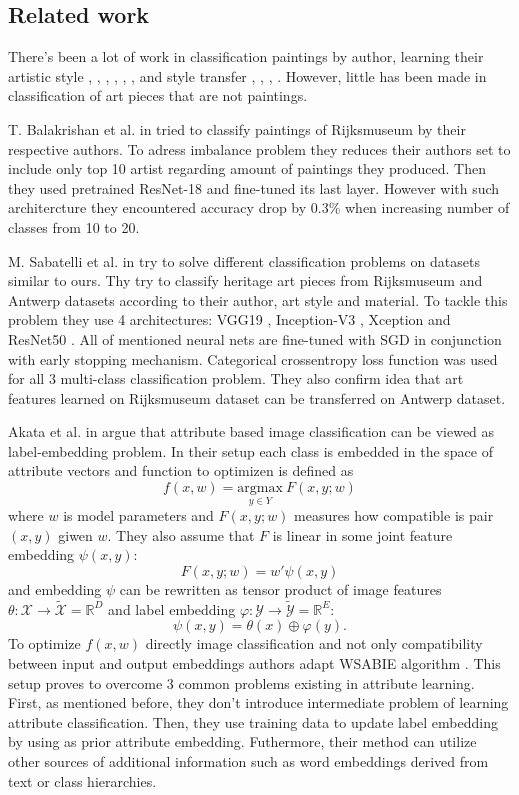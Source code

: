 \documentclass[10pt,twocolumn,letterpaper]{article}
\begin{document}
\subsection{Related work}

There's been a lot of work in classification paintings by author, learning their artistic style  \cite{paint_class}, \cite{rec_style}, \cite{learned_style}, \cite{draw_style}, \cite{la_style}, \cite{la_style_2}, and style transfer \cite{johnson_style_transf}, \cite{huang_style_transf}, \cite{ulyaniv_stylized_img}, \cite{jie_style_transf}. However, little has been made in classification of art pieces that are not paintings. 

T. Balakrishan et al. in \cite{Rijks} tried to classify paintings of Rijksmuseum by their respective authors. To adress imbalance problem they reduces their authors set to include only top 10 artist regarding amount of paintings they produced. Then they used pretrained ResNet-18 and fine-tuned its last layer. However with such architercture they encountered accuracy drop by 0.3\% when increasing number of classes from 10 to 20.

M. Sabatelli et al. in \cite{deep_cnn_class} try to solve different classification problems on datasets similar to ours. Thy try to classify heritage art pieces from Rijksmuseum and Antwerp datasets according to their author, art style and material. To tackle this problem they use 4 architectures: VGG19 \cite{vgg}, Inception-V3 \cite{inc-v3}, Xception \cite{xception} and ResNet50 \cite{resnet50}. All of mentioned neural nets are fine-tuned with SGD in conjunction with early stopping mechanism. Categorical crossentropy loss function was used for all 3 multi-class classification problem. They also confirm idea that art features learned on Rijksmuseum dataset can be transferred on Antwerp dataset. 

Akata et al. in \cite{akata_emb} argue that attribute based image classification can be viewed as label-embedding problem. In their setup each class is embedded in the space of attribute vectors and function to optimizen is defined as 
$$f(x,w)=\underset{y \in Y}{\mathrm{argmax }}\ F(x,y;w)$$
where $w$ is model parameters and $F(x,y;w)$ measures how compatible is pair $(x,y)$ giwen $w$. They also assume that $F$ is linear in some joint feature embedding $\psi(x,y)$:
$$ F(x,y;w)=w'\psi(x,y)$$
and embedding $\psi$ can be rewritten as tensor product of image features $\theta : \mathcal{X} \rightarrow \widetilde{\mathcal{X}} = \mathbb{R}^D$ and label embedding $\varphi : \mathcal{Y} \rightarrow \widetilde{\mathcal{Y}} = \mathbb{R}^E$:
$$\psi(x,y)=\theta(x)\oplus \varphi(y). $$
To optimize $f(x,w)$ directly image classification and not only compatibility between input and output embeddings authors adapt WSABIE algorithm \cite{wsabie}. This setup proves to overcome 3 common problems existing in attribute learning. First, as mentioned before, they don't introduce intermediate problem of learning attribute classification. Then, they use training data to update label embedding by using as prior attribute embedding. Futhermore, their method can utilize other sources of additional information such as word embeddings derived from text or class hierarchies.
\end{document}
